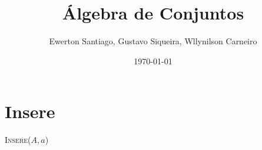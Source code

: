 \documentclass[a4paper]{article}
\begin{document}
  \title{Álgebra de Conjuntos}
  \author{Ewerton Santiago, Gustavo Siqueira, Wllynilson Carneiro}
  \date{\today}
  \maketitle
  
  \section{Insere}

  \begin{algorithm}[H]
    \label{alg1}
    \caption {\textsc{Insere($A, a$)}}
    \Saida{}
    \SetAlgoLined
      \end{algorithm}
  
\end{document}
